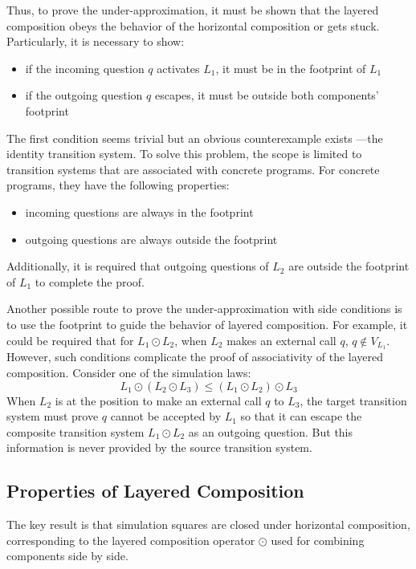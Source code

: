 Thus, to prove the under-approximation, it must be shown that the layered composition
obeys the behavior of the horizontal composition or gets stuck. Particularly, it is necessary to show:
\begin{itemize}
  \item if the incoming question $q$ activates $L_1$, it must be in the
    footprint of $L_1$
  \item if the outgoing question $q$ escapes, it must be outside both components'
    footprint
\end{itemize}

The first condition seems trivial but an obvious counterexample exists%
---the identity transition system. To solve this problem, the scope is limited to
transition systems that are associated with concrete programs. For concrete
programs, they have the following properties:
\begin{itemize}
  \item incoming questions are always in the footprint
  \item outgoing questions are always outside the footprint
\end{itemize}
Additionally, it is required that outgoing questions of $L_2$ are outside the footprint of
$L_1$ to complete the proof.

\begin{remark}
  Another possible route to prove the under-approximation with side conditions is
  to use the footprint to guide the behavior of layered composition. For example,
  it could be required that for $L_1 \odot L_2$, when $L_2$ makes an external call
  $q$, $q \notin V_{L_1}$. However, such conditions complicate the proof of
  associativity of the layered composition. Consider one of the simulation laws:
  \[
    L_1 \odot (L_2 \odot L_3) \le (L_1 \odot L_2) \odot L_3
  \]
  When $L_2$ is at the position to make an external call $q$ to $L_3$, the target
  transition system must prove $q$ cannot be accepted by $L_1$ so that it can
  escape the composite transition system $L_1 \odot L_2$ as an outgoing question.
  But this information is never provided by the source transition system.
\end{remark}

\subsection{Properties of Layered Composition}

The key result is that simulation squares are closed
under horizontal composition,
corresponding to the layered composition operator $\odot$
used for combining components side by side.


